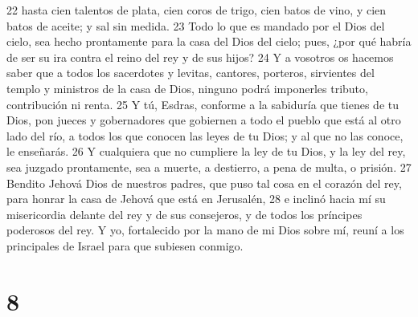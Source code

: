 22 hasta cien talentos de plata,  cien coros de trigo, cien batos de vino, y cien batos de aceite; y sal sin medida.
23 Todo lo que es mandado por el Dios del cielo, sea hecho prontamente para la casa del Dios del cielo; pues, ¿por qué habría de ser su ira contra el reino del rey y de sus hijos?
24 Y a vosotros os hacemos saber que a todos los sacerdotes y levitas, cantores, porteros, sirvientes del templo y ministros de la casa de Dios, ninguno podrá imponerles tributo, contribución ni renta.
25 Y tú, Esdras, conforme a la sabiduría que tienes de tu Dios, pon jueces y gobernadores que gobiernen a todo el pueblo que está al otro lado del río, a todos los que conocen las leyes de tu Dios; y al que no las conoce, le enseñarás.
26 Y cualquiera que no cumpliere la ley de tu Dios, y la ley del rey, sea juzgado prontamente, sea a muerte, a destierro, a pena de multa, o prisión.
27 Bendito Jehová Dios de nuestros padres, que puso tal cosa en el corazón del rey, para honrar la casa de Jehová que está en Jerusalén,
28 e inclinó hacia mí su misericordia delante del rey y de sus consejeros, y de todos los príncipes poderosos del rey. Y yo, fortalecido por la mano de mi Dios sobre mí, reuní a los principales de Israel para que subiesen conmigo. 

\chapter{8}

